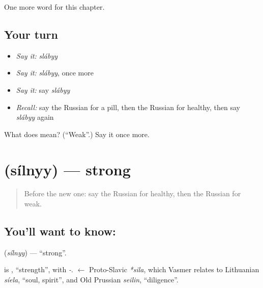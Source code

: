 \begin{grammarlens}[title={What you've built}]
One more word for this chapter.
\end{grammarlens}

\subsection*{Your turn}
\begin{itemize}
\raggedright
  \item \emph{Say it:} \emph{slábyy}
  \item \emph{Say it:} \emph{slábyy}, once more
  \item \emph{Say it:} say \emph{slábyy}
  \item \emph{Recall:} say the Russian for a pill, then the Russian for healthy, then say \emph{slábyy} again
\end{itemize}

\begin{tcolorbox}[breakable,colback=teal!4,colframe=teal!35!black,title={Before you move on}]
What does  mean? (\textquotedblleft{}Weak\textquotedblright{}.) Say it once more.
\end{tcolorbox}
\section[\texorpdfstring{\ru{сильный} (sílnyy)}{сильный (sílnyy)}]{ (sílnyy) — strong}

\label{lesson:RU-C148-silnyy}



\begin{quote}
Before the new one: say the Russian for healthy, then the Russian for weak.
\end{quote}

\subsection*{You'll want to know: }
\textbf{} (\emph{sílnyy}) — \textquotedblleft{}strong\textquotedblright{}.

\begin{cousinweb}
\textbf{} is \emph{}, \textquotedblleft{}strength\textquotedblright{}, with \emph{-}. \emph{} $\leftarrow$ Proto-Slavic \emph{*sila}, which Vasmer relates to Lithuanian \emph{síela}, \textquotedblleft{}soul, spirit\textquotedblright{}, and Old Prussian \emph{seilin}, \textquotedblleft{}diligence\textquotedblright{}.
\end{cousinweb}


